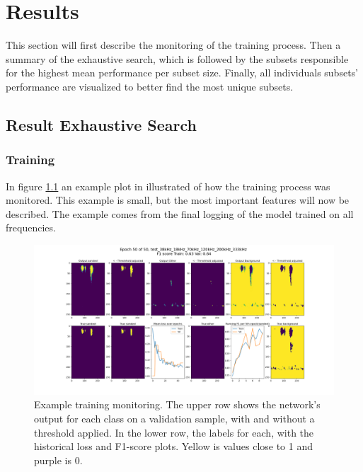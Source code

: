 \chapter{Results} \label{results}
This section will first describe the monitoring of the training process. Then a summary of the exhaustive search, which is followed by the subsets responsible for the highest mean performance per subset size. Finally, all individuals subsets' performance are visualized to better find the most unique subsets. 

\section{Result Exhaustive Search}
    
    \subsection{Training}
        In figure \ref{training_overveiw_fig} an example plot in illustrated of how the training process was monitored. This example is small, but the most important features will now be described. The example comes from the final logging of the model trained on all frequencies.
        \clearpage
        \begin{figure}[H]

            \hspace*{-3.2cm}
            \includegraphics[scale=0.45]{figures/epoch_50_test_38kHz_18kHz_70kHz_120kHz_200kHz_333kHz.png}
            \caption[Training example monitoring]{Example training monitoring. The upper row shows the network's output for each class on a validation sample, with and without a threshold applied. In the lower row, the labels for each, with the historical loss and F1-score plots. Yellow is values close to 1 and purple is 0.}
          	\medskip 
            \label{training_overveiw_fig}
        \end{figure}
        
